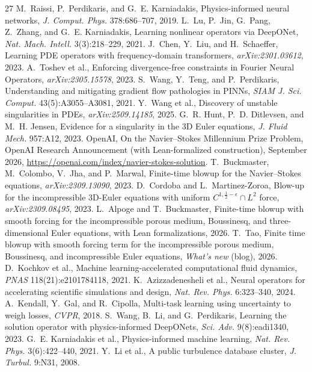 \documentclass[review]{elsarticle}
\begin{document}
\begin{thebibliography}{27}
 M.~Raissi, P.~Perdikaris, and G.~E. Karniadakis, Physics-informed neural networks, \emph{J. Comput. Phys.} 378:686--707, 2019.
 L.~Lu, P.~Jin, G.~Pang, Z.~Zhang, and G.~E. Karniadakis, Learning nonlinear operators via DeepONet, \emph{Nat. Mach. Intell.} 3(3):218--229, 2021.
 J.~Chen, Y.~Liu, and H.~Schaeffer, Learning PDE operators with frequency-domain transformers, \emph{arXiv:2301.03612}, 2023.
 A.~Toshev et al., Enforcing divergence-free constraints in Fourier Neural Operators, \emph{arXiv:2305.15578}, 2023.
 S.~Wang, Y.~Teng, and P.~Perdikaris, Understanding and mitigating gradient flow pathologies in PINNs, \emph{SIAM J. Sci. Comput.} 43(5):A3055--A3081, 2021.
 Y.~Wang et al., Discovery of unstable singularities in PDEs, \emph{arXiv:2509.14185}, 2025.
 G.~R. Hunt, P.~D. Ditlevsen, and M.~H. Jensen, Evidence for a singularity in the 3D Euler equations, \emph{J. Fluid Mech.} 957:A12, 2023.
 OpenAI, On the Navier--Stokes Millennium Prize Problem, OpenAI Research Announcement (with Lean-formalized construction), September 2026, \url{https://openai.com/index/navier-stokes-solution}.
 T.~Buckmaster, M.~Colombo, V.~Jha, and P.~Marwal, Finite-time blowup for the Navier--Stokes equations, \emph{arXiv:2309.13090}, 2023.
 D.~Cordoba and L.~Martinez-Zoroa, Blow-up for the incompressible 3D-Euler equations with uniform $C^{1,\frac12-\epsilon}\cap L^2$ force, \emph{arXiv:2309.08495}, 2023.
 L.~Alpoge and T.~Buckmaster, Finite-time blowup with smooth forcing for the incompressible porous medium, Boussinesq, and three-dimensional Euler equations, with Lean formalizations, 2026.
 T.~Tao, Finite time blowup with smooth forcing term for the incompressible porous medium, Boussinesq, and incompressible Euler equations, \emph{What's new} (blog), 2026.
 D.~Kochkov et al., Machine learning-accelerated computational fluid dynamics, \emph{PNAS} 118(21):e2101784118, 2021.
 K.~Azizzadenesheli et al., Neural operators for accelerating scientific simulations and design, \emph{Nat. Rev. Phys.} 6:323--340, 2024.
 A.~Kendall, Y.~Gal, and R.~Cipolla, Multi-task learning using uncertainty to weigh losses, \emph{CVPR}, 2018.
 S.~Wang, B.~Li, and G.~Perdikaris, Learning the solution operator with physics-informed DeepONets, \emph{Sci. Adv.} 9(8):eadi1340, 2023.
 G.~E. Karniadakis et al., Physics-informed machine learning, \emph{Nat. Rev. Phys.} 3(6):422--440, 2021.
 Y.~Li et al., A public turbulence database cluster, \emph{J. Turbul.} 9:N31, 2008.

\end{thebibliography}
\end{document}
